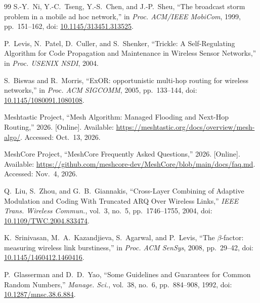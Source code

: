 \begin{thebibliography}{99}
S.-Y.~Ni, Y.-C.~Tseng, Y.-S.~Chen, and J.-P.~Sheu,
``The broadcast storm problem in a mobile ad hoc network,''
in \emph{Proc. ACM/IEEE MobiCom}, 1999, pp.~151--162,
doi: \url{10.1145/313451.313525}.

P.~Levis, N.~Patel, D.~Culler, and S.~Shenker,
``Trickle: A Self-Regulating Algorithm for Code Propagation and Maintenance in Wireless Sensor Networks,''
in \emph{Proc. USENIX NSDI}, 2004.

S.~Biswas and R.~Morris,
``ExOR: opportunistic multi-hop routing for wireless networks,''
in \emph{Proc. ACM SIGCOMM}, 2005, pp.~133--144,
doi: \url{10.1145/1080091.1080108}.

Meshtastic Project,
``Mesh Algorithm: Managed Flooding and Next-Hop Routing,''
2026. [Online]. Available:
\url{https://meshtastic.org/docs/overview/mesh-algo/}.
Accessed: Oct.~13, 2026.

MeshCore Project,
``MeshCore Frequently Asked Questions,''
2026. [Online]. Available:
\url{https://github.com/meshcore-dev/MeshCore/blob/main/docs/faq.md}.
Accessed: Nov.~4, 2026.

Q.~Liu, S.~Zhou, and G.~B.~Giannakis,
``Cross-Layer Combining of Adaptive Modulation and Coding With Truncated ARQ Over Wireless Links,''
\emph{IEEE Trans. Wireless Commun.}, vol.~3, no.~5, pp.~1746--1755, 2004,
doi: \url{10.1109/TWC.2004.833474}.

K.~Srinivasan, M.~A.~Kazandjieva, S.~Agarwal, and P.~Levis,
``The $\beta$-factor: measuring wireless link burstiness,''
in \emph{Proc. ACM SenSys}, 2008, pp.~29--42,
doi: \url{10.1145/1460412.1460416}.

P.~Glasserman and D.~D.~Yao,
``Some Guidelines and Guarantees for Common Random Numbers,''
\emph{Manage. Sci.}, vol.~38, no.~6, pp.~884--908, 1992,
doi: \url{10.1287/mnsc.38.6.884}.

\end{thebibliography}
